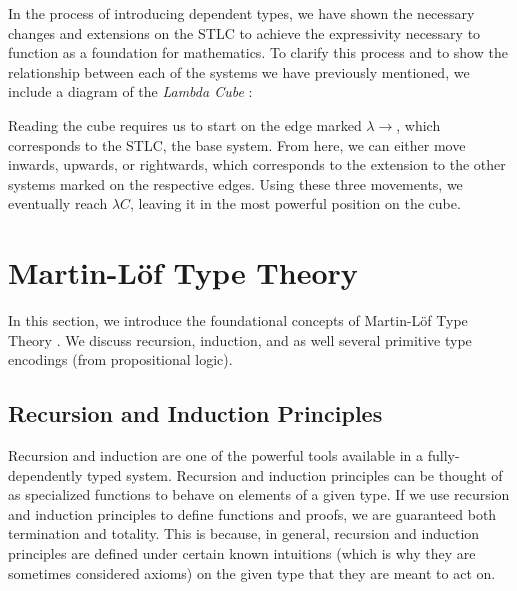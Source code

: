 \documentclass[12pt]{article}
\begin{document}
In the process of introducing dependent types, we have shown the necessary
changes and extensions on the STLC to achieve the expressivity necessary to
function as a foundation for mathematics. To clarify this process and to show
the relationship between each of the systems we have previously mentioned, we
include a diagram of the {\em Lambda Cube} \cite{}:
\begin{center}
\end{center}
Reading the cube requires us to start on the edge marked \(\lambda\!\!\rightarrow\),
which corresponds to the STLC, the base system. From here, we can either move
inwards, upwards, or rightwards, which corresponds to the extension to the other
systems marked on the respective edges. Using these three movements, we
eventually reach \(\lambda C\), leaving it in the most powerful position
on the cube.

\section{Martin-L\"of Type Theory}
In this section, we introduce the foundational concepts of Martin-L\"of Type
Theory \cite{}. We discuss recursion, induction, and as well several primitive type
encodings (from propositional logic).

\subsection*{Recursion and Induction Principles}
Recursion and induction are one of the powerful tools available in a
fully-dependently typed system. Recursion and induction principles can be
thought of as specialized functions to behave on elements of a given type.
If we use recursion and induction principles to define functions and proofs,
we are guaranteed both termination and totality. This is because, in general,
recursion and induction principles are defined under certain known intuitions
(which is why they are sometimes considered axioms) on the given type that
they are meant to act on.
\end{document}
